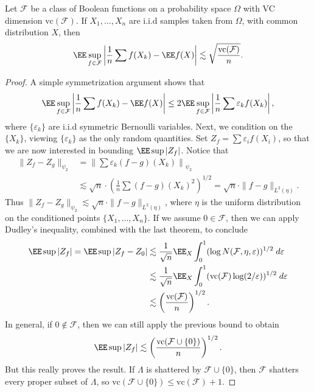 \begin{theorem}
	Let $\mathcal{F}$ be a class of Boolean functions on a probability space $\Omega$ with VC dimension $\text{vc}(\mathcal{F})$. If $X_1, \dots, X_n$ are i.i.d samples taken from $\Omega$, with common distribution $X$, then
	\[ \EE \sup_{f \in \mathcal{F}} \left| \frac{1}{n} \sum f(X_k) - \EE f(X)  \right| \lesssim \sqrt{\frac{\text{vc}(\mathcal{F})}{n}}. \]
\end{theorem}
\begin{proof}
	A simple symmetrization argument shows that
	\[ \EE \sup_{f \in \mathcal{F}} \left| \frac{1}{n} \sum f(X_k) - \EE f(X)  \right| \leq 2 \EE \sup_{f \in \mathcal{F}} \left| \frac{1}{n} \sum \varepsilon_k f(X_k) \right|, \]
	where $\{ \varepsilon_k \}$ are i.i.d symmetric Bernoulli variables. Next, we condition on the $\{ X_k \}$, viewing $\{ \varepsilon_k \}$ as the only random quantities. Set $Z_f = \sum \varepsilon_i f(X_i)$, so that we are now interested in bounding $\EE \sup |Z_f|$. Notice that
	\begin{align*}
		\| Z_f - Z_g \|_{\psi_2} &= \left\| \sum \varepsilon_k(f - g)(X_k) \right\|_{\psi_2}\\
		&\lesssim \sqrt{n} \cdot \left( \frac{1}{n} \sum (f - g)(X_k)^2 \right)^{1/2} = \sqrt{n} \cdot \| f - g \|_{L^2(\eta)}.
	\end{align*}
	Thus $\| Z_f - Z_g \|_{\psi_2} \lesssim \sqrt{n} \cdot \| f - g \|_{L^2(\eta)}$, where $\eta$ is the uniform distribution on the conditioned points $\{ X_1, \dots, X_n \}$. If we assume $0 \in \mathcal{F}$, then we can apply Dudley's inequality, combined with the last theorem, to conclude
	\begin{align*}
		\EE \sup |Z_f| = \EE \sup |Z_f - Z_0| &\lesssim \frac{1}{\sqrt{n}} \EE_X \int_0^1 (\log N(\mathcal{F}, \eta, \varepsilon))^{1/2}\; d\varepsilon\\
		&\lesssim \frac{1}{\sqrt{n}} \EE_X \int_0^1 (\text{vc}(\mathcal{F}) \log(2/\varepsilon))^{1/2}\; d\varepsilon\\
		&\lesssim \left( \frac{\text{vc}(\mathcal{F})}{n} \right)^{1/2}.
	\end{align*}
	In general, if $0 \not \in \mathcal{F}$, then we can still apply the previous bound to obtain
	\[ \EE \sup |Z_f| \lesssim \left( \frac{\text{vc}(\mathcal{F} \cup \{ 0 \})}{n} \right)^{1/2}. \]
	But this really proves the result. If $\Lambda$ is shattered by $\mathcal{F} \cup \{ 0 \}$, then $\mathcal{F}$ shatters every proper subset of $\Lambda$, so $\text{vc}(\mathcal{F} \cup \{ 0 \}) \leq \text{vc}(\mathcal{F}) + 1$.
\end{proof}


